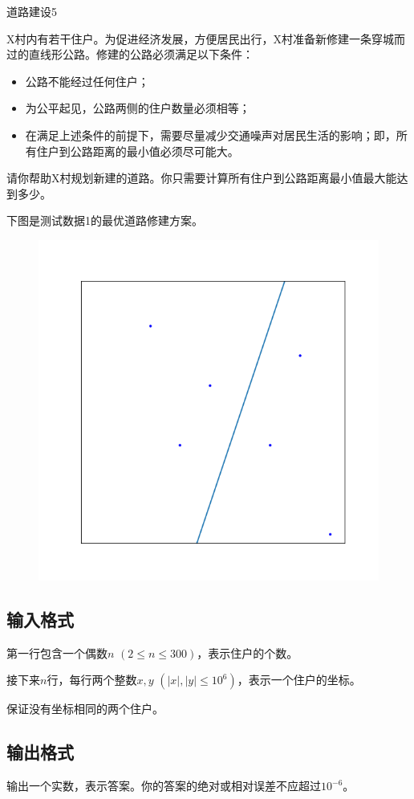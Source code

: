\begin{Problem}{道路建设}{5}

X村内有若干住户。为促进经济发展，方便居民出行，X村准备新修建一条穿城而过的直线形公路。修建的公路必须满足以下条件：

\begin{itemize}
\item 公路不能经过任何住户；
\item 为公平起见，公路两侧的住户数量必须相等；
\item 在满足上述条件的前提下，需要尽量减少交通噪声对居民生活的影响；即，所有住户到公路距离的最小值必须尽可能大。
\end{itemize}

请你帮助X村规划新建的道路。你只需要计算所有住户到公路距离最小值最大能达到多少。

下图是测试数据1的最优道路修建方案。

\begin{figure}[h]
\center
\includegraphics{src/road/01-sample.png}
\end{figure}

\subsection*{输入格式}

第一行包含一个偶数$n$ $(2 \leq n \leq 300)$，表示住户的个数。

接下来$n$行，每行两个整数$x, y$ $(|x|, |y| \leq 10^6)$，表示一个住户的坐标。

保证没有坐标相同的两个住户。

\subsection*{输出格式}

输出一个实数，表示答案。你的答案的绝对或相对误差不应超过$10^{-6}$。


\end{Problem}
